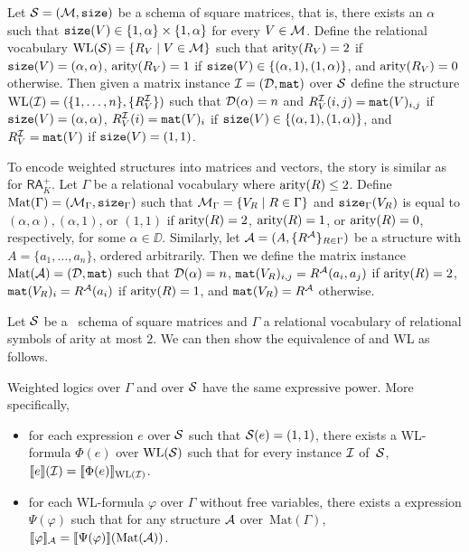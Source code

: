 Let $\mathcal{S}=(\mathcal{M},\texttt{size})$ be a schema of square matrices, that is, there exists an $\alpha$ such that $\texttt{size}(V) \in \{1, \alpha\} \times \{1,\alpha\}$ for every $V \in \mathcal{M}$.
Define the relational vocabulary $\text{WL}(\mathcal{S}) = \{R_V \mid V \in \mathcal{M}\}$ such that $\operatorname{arity}(R_V) = 2$ if $\texttt{size}(V) = (\alpha, \alpha)$, $\operatorname{arity}(R_V) = 1$ if $\texttt{size}(V) \in \{(\alpha,1), (1,\alpha)\}$, and $\operatorname{arity}(R_V) = 0$ otherwise.
Then given a matrix instance $\mathcal{I} = (\mathcal{D},\texttt{mat})$ over $\mathcal{S}$ define the structure $\text{WL}(\mathcal{I}) = (\{1, \ldots, n\}, \{R_V^{\mathcal{I}}\} )$ such that $\mathcal{D}(\alpha) = n$ and $R_V^{\mathcal{I}}(i, j) = \texttt{mat}(V)_{i,j}$ if $\texttt{size}(V) = (\alpha, \alpha)$, $R_V^{\mathcal{I}}(i) = \texttt{mat}(V)_{i}$ if $\texttt{size}(V) \in \{(\alpha,1), (1,\alpha)\}$, and $R_V^{\mathcal{I}} = \texttt{mat}(V)$ if $\texttt{size}(V) = (1,1)$.

To encode weighted structures into matrices and vectors, the story is similar as for $\mathsf{RA}_K^+$. Let $\Gamma$ be a relational vocabulary where $\operatorname{arity}(R) \leq 2$. 
Define $\text{Mat}(\Gamma) = (\mathcal{M}_\Gamma,\texttt{size}_\Gamma)$ such that $\mathcal{M}_\Gamma = \{ V_{R} \mid R \in \Gamma\}$ and $\texttt{size}_\Gamma(V_{R})$ is equal to $(\alpha, \alpha), (\alpha, 1)$, or $(1,1)$ if $\operatorname{arity}(R)=2$, $\operatorname{arity}(R)=1$, or $\operatorname{arity}(R)=0$, respectively, for some $\alpha \in \DD$. Similarly, let $\mathcal{A} = (A, \{R^{\mathcal{A}}\}_{R \in \Gamma})$ be a structure with $A = \{a_1, \ldots, a_n\}$, ordered arbitrarily.
Then we define the matrix instance $\text{Mat}(\mathcal{A}) = (\mathcal{D},\texttt{mat})$ such that $\mathcal{D}(\alpha) = n$, $\texttt{mat}(V_{R})_{i,j} = R^{\mathcal{A}}(a_i, a_j)$ if $\operatorname{arity}(R)=2$, $\texttt{mat}(V_{R})_{i} = R^{\mathcal{A}}(a_i)$ if $\operatorname{arity}(R)=1$, and $\texttt{mat}(V_{R}) = R^{\mathcal{A}}$ otherwise.

Let $\mathcal{S}$ be a \lang\ schema of square matrices and $\Gamma$ a relational vocabulary of relational symbols of arity at most $2$. We can then show the equivalence of \langprod and WL as follows. 
\begin{proposition} \label{prop:wl}
Weighted logics over $\Gamma$ and \langprod over $\mathcal{S}$ have the same expressive power. More specifically,
\begin{itemize}
	\item for each \langprod expression $e$ over $\mathcal{S}$ such that $\mathcal{S}(e)=(1,1)$, there exists a WL-formula $\Phi(e)$ over $\text{WL}(\mathcal{S})$ such that for every instance $\mathcal{I}$ of~$\mathcal{S}$, 
	$
	\llbracket e \rrbracket(\mathcal{I}) = \llbracket \Phi(e) \rrbracket_{\text{WL}(\mathcal{I})}
	$.
	\item for each WL-formula $\varphi$ over $\Gamma$ without free variables, there exists a \langprod expression $\Psi(\varphi)$ such that for any structure $\mathcal{A}$ over~$\text{Mat}(\Gamma)$,
	$
	\llbracket \varphi \rrbracket_{\mathcal{A}}=\llbracket \Psi(\varphi) \rrbracket(\text{Mat}(\mathcal{A}))
	$.
\end{itemize}	
\end{proposition}
